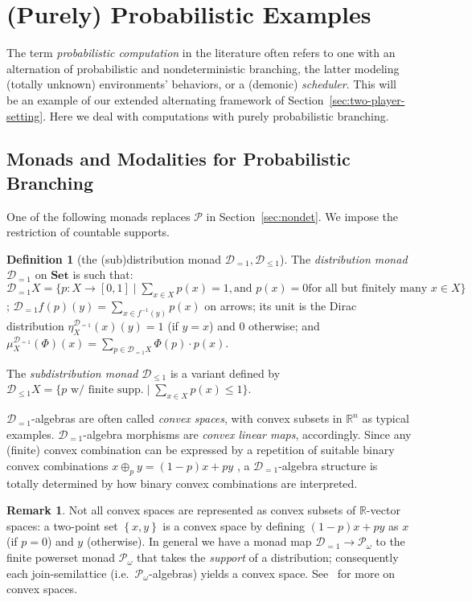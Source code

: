 \documentclass[9pt, preprint]{sigplanconf}
\theoremstyle{theorem}
\theoremstyle{definition}
\newtheorem{definition}[theorem]{Definition}
\newtheorem{remark}[theorem]{Remark}
\newcommand{\bbR}{\mathbb{R}}
\newcommand{\pow}{\mathcal{P}}
\newcommand{\dist}{\mathcal{D}_{=1}}
\newcommand{\sdist}{\mathcal{D}_{\le 1}}
\newcommand{\sett}[1]{\left\{ #1 \right\}}
\newcommand{\Set}{\mathbf{Set}}
\newcommand{\Sets}{\Set}
\newcommand{\fpow}{\mathcal{P}_{\omega}}
\begin{document}
\section{(Purely) Probabilistic Examples}
\label{sec:prob-examples}


The term \emph{probabilistic computation} in the literature often refers
to one with an alternation of probabilistic and nondeterministic
branching, the latter modeling (totally unknown) environments'
behaviors, or a (demonic) \emph{scheduler}. This will be an example of our extended alternating
framework of Section~\ref{sec:two-player-setting}. Here we deal with
computations with purely probabilistic branching.


\subsection{Monads and Modalities for Probabilistic Branching
}
\label{subs:dist-monad}

One of the following monads replaces $\pow$ in Section~\ref{sec:nondet}.
We impose the restriction of countable supports.
\begin{definition}[the (sub)distribution monad $\dist,\sdist$]
The \emph{distribution monad} $\dist$ on $\Sets$ is such that:
 $\dist X=\{p:X\to [0,1]\mid \sum_{x\in X}p(x)= 1, \text{and $p(x)=0$
 for all but finitely many $x\in X$}\}$;
 $\dist f(p)(y)= \sum_{x\in f^{-1}(y)}p(x)$ on arrows; its unit is the
 Dirac distribution
 $\eta^{\dist}_{X}(x)(y)= 1$ (if $y=x$) and $0$ otherwise; and
 $\mu^{\dist}_{X}(\Phi)(x)=\sum_{p\in \dist X}\Phi(p)\cdot p(x)$.

 The \emph{subdistribution monad} $\sdist$
 is a variant defined by
 $\sdist X=\{p \text{ w/ finite supp.}
\mid \sum_{x\in X}p(x)\le 1\}$.
\end{definition}








 $\dist$-algebras are often called \emph{convex spaces}, with   convex
 subsets in  $\bbR^n$ as typical
 examples.
$\dist$-algebra morphisms are  \emph{convex linear maps}, accordingly.
Since any (finite) convex combination can be expressed by
a repetition of
suitable binary convex combinations $x \oplus_p y = (1-p)x + py$ ,
a $\dist$-algebra structure is totally determined
by how  binary convex combinations are interpreted.

\begin{remark}
  Not all convex spaces are represented as convex subsets of
  $\bbR$-vector spaces: a two-point set $\sett{x, y}$ is
  a convex space by defining $(1-p)x + py$ as $x$ (if $p = 0$)
  and $y$ (otherwise). In general we have a monad map $\dist \to \fpow$
  to the finite powerset monad $\fpow$ that takes the \emph{support} of
 a distribution; consequently
 each join-semilattice (i.e.\ $\fpow$-algebras)
  yields a convex space.
  See~\cite{fritz2009convex} for more on
 convex spaces.
\end{remark}
\end{document}
